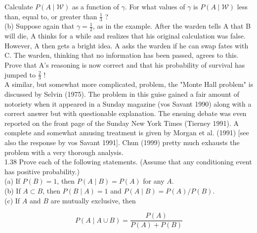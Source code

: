 \documentclass[10pt]{article}
\begin{document}
Calculate $P(A \mid \mathcal{W})$ as a function of $\gamma$. For what values of $\gamma$ is $P(A \mid \mathcal{W})$ less than, equal to, or greater than $\frac{1}{3}$ ?\\
(b) Suppose again that $\gamma=\frac{1}{2}$, as in the example. After the warden tells A that B will die, A thinks for a while and realizes that his original calculation was false. However, A then gets a bright idea. A asks the warden if he can swap fates with C. The warden, thinking that no information has been passed, agrees to this. Prove that A's reasoning is now correct and that his probability of survival has jumped to $\frac{2}{3}$ !\\[0pt]
A similar, but somewhat more complicated, problem, the "Monte Hall problem" is discussed by Selvin (1975). The problem in this guise gained a fair amount of notoriety when it appeared in a Sunday magazine (vos Savant 1990) along with a correct answer but with questionable explanation. The ensuing debate was even reported on the front page of the Sunday New York Times (Tierney 1991). A complete and somewhat amusing treatment is given by Morgan et al. (1991) [see also the response by vos Savant 1991]. Chun (1999) pretty much exhausts the problem with a very thorough analysis.\\
1.38 Prove each of the following statements. (Assume that any conditioning event has positive probability.)\\
(a) If $P(B)=1$, then $P(A \mid B)=P(A)$ for any $A$.\\
(b) If $A \subset B$, then $P(B \mid A)=1$ and $P(A \mid B)=P(A) / P(B)$.\\
(c) If $A$ and $B$ are mutually exclusive, then

$$
P(A \mid A \cup B)=\frac{P(A)}{P(A)+P(B)}
$$
\end{document}
